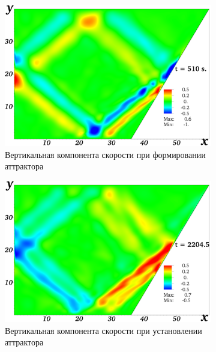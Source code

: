 \begin{figure}
  \centering
  \begin{subfigure}[с]{0.45\textwidth}
    \includegraphics[width=1\textwidth]{pics/H40L60N1ap05dp20w1p63Deltawp05Biharm/2D36x36DiagramH40L60N1ap05dp20w0p63Deltawp3315BiharmVyn01019.png}
    \caption{Вертикальная компонента скорости при формировании аттрактора}
  \end{subfigure}
  \begin{subfigure}[с]{0.45\textwidth}
    \includegraphics[width=1\textwidth]{pics/H40L60N1ap05dp20w1p63Deltawp05Biharm/2D36x36DiagramH40L60N1ap05dp20w0p63Deltawp3315BiharmVyn04408.png}
    \caption{Вертикальная компонента скорости при установлении аттрактора}
  \end{subfigure}
  \par
  \begin{subfigure}[с]{0.45\textwidth}

\end{subfigure}
\end{figure}
